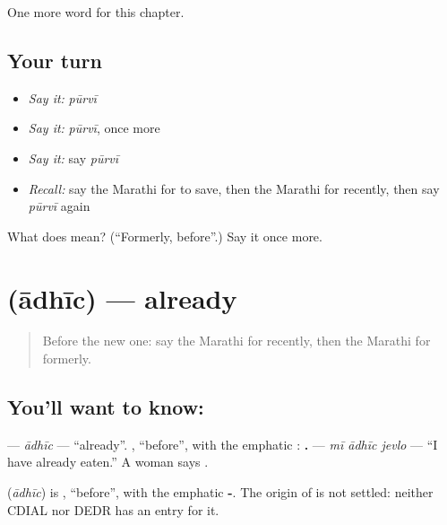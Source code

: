 \begin{grammarlens}[title={What you've built}]
One more word for this chapter.
\end{grammarlens}

\subsection*{Your turn}
\begin{itemize}
\raggedright
  \item \emph{Say it:} \emph{pūrvī}
  \item \emph{Say it:} \emph{pūrvī}, once more
  \item \emph{Say it:} say \emph{pūrvī}
  \item \emph{Recall:} say the Marathi for to save, then the Marathi for recently, then say \emph{pūrvī} again
\end{itemize}

\begin{tcolorbox}[breakable,colback=teal!4,colframe=teal!35!black,title={Before you move on}]
What does  mean? (\textquotedblleft{}Formerly, before\textquotedblright{}.) Say it once more.
\end{tcolorbox}
\section[\texorpdfstring{\mr{आधीच} (ādhīc)}{आधीच (ādhīc)}]{ (ādhīc) — already}

\label{lesson:MR-C159-adhic}



\begin{quote}
Before the new one: say the Marathi for recently, then the Marathi for formerly.
\end{quote}

\subsection*{You'll want to know: }
\textbf{} — \emph{ādhīc} — \textquotedblleft{}already\textquotedblright{}. \textbf{}, \textquotedblleft{}before\textquotedblright{}, with the emphatic \textbf{}: \textbf{  .} — \emph{mī ādhīc jevlo} — \textquotedblleft{}I have already eaten.\textquotedblright{} A woman says \textbf{}.

\begin{cousinweb}
\textbf{} (\emph{ādhīc}) is \textbf{}, \textquotedblleft{}before\textquotedblright{}, with the emphatic \textbf{-}. The origin of \textbf{} is not settled: neither CDIAL nor DEDR has an entry for it.
\end{cousinweb}

